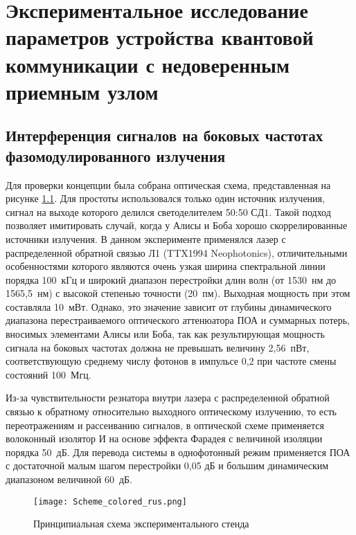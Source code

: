 \chapter{Экспериментальное исследование параметров устройства квантовой коммуникации с недоверенным приемным узлом} \label{ch:ch6}
\section{Интерференция сигналов на боковых частотах фазомодулированного излучения} \label{sec:ch6/sec1}

Для проверки концепции была собрана оптическая схема, представленная на рисунке \ref{fig:RF_sin}. Для простоты использовался только один источник излучения, сигнал на выходе которого делился светоделителем 50:50 $СД1$. Такой подход позволяет имитировать случай, когда у Алисы и Боба хорошо скоррелированные источники излучения. В данном эксперименте применялся лазер с распределенной обратной связью Л1 (TTX1994 Neophotonics), отличительными особенностями которого являются очень узкая ширина спектральной линии порядка 100~кГц и широкий диапазон перестройки длин волн (от 1530~нм до 1565,5~нм) с высокой степенью точности (20~пм). Выходная мощность при этом составляла 10~мВт. Однако, это значение зависит от глубины динамического диапазона перестраиваемого оптического аттенюатора ПОА и суммарных потерь, вносимых элементами Алисы или Боба, так как результирующая мощность сигнала на боковых частотах должна не превышать величину 2,56~пВт, соответствующую среднему числу фотонов в импульсе 0,2 при частоте смены состояний 100~Мгц.   

Из-за чувствительности резнатора внутри лазера с распределенной обратной связью к обратному относительно выходного оптическому излучению, то есть переотражениям и рассеиванию сигналов, в оптической схеме применяется волоконный изолятор И на основе эффекта Фарадея с величиной изоляции порядка 50~дБ. Для перевода системы в однофотонный режим применяется ПОА с достаточной малым шагом перестройки 0,05 дБ и большим динамическим диапазоном величиной 60~дБ.  

 \begin{figure}[ht]
  \centering
  \texttt{[image: Scheme\_colored\_rus.png]}
  \caption{Принципиальная схема экспериментального стенда}
  \label{fig:RF_sin}
\end{figure}

